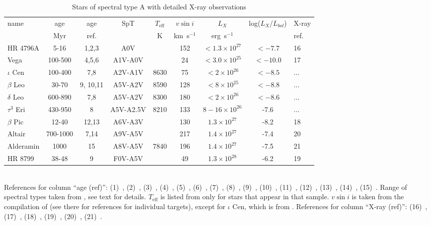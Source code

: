 \documentclass[linenumbers]{aastex631}
\begin{document}
\begin{table}
\caption{Stars of spectral type A with detailed X-ray observations \label{tab}}
\begin{tabular}{lcccccccl}
  name      & age & age & SpT  & $T_\mathrm{eff}$ & $v\sin i$ & $L_X$ &   log($L_X$/$L_{bol}$) & X-ray\\
            & Myr & ref.&  & K & km~s$^{-1}$    & erg~s$^{-1}$  &  & ref. \\
\hline
HR 4796A    & 5-16 & 1,2,3   & A0V & & 152 & $<1.3\times 10^{27}$  & $< -7.7$ & 16\\
Vega  & 100-500 & 4,5,6   & A1V-A0V & & 24 & $<3.0\times 10^{25}$  & $< -10.0$& 17\\
$\iota$ Cen & 100-400 & 7,8 & A2V-A1V & 8630 & 75 & $<2\times 10^{26}$  & $< -8.5$ & ...\\
$\beta$ Leo & 30-70& 9, 10,11 & A5V-A2V & 8590 & 128 & $<8\times 10^{25}$  & $< -8.8$ & ...\\
$\delta$ Leo& 600-890 & 7,8 & A5V-A2V & 8300 & 180 & $<2\times 10^{26}$  & $< -8.6$ & ...\\
$\tau^3$ Eri & 430-950 & 8 & A5V-A2.5V & 8210 & 133 & $8-16\times 10^{26}$  & -7.6 & ...\\
$\beta$ Pic & 12-40 & 12,13 & A6V-A3V  & & 130 & $1.3\times10^{27}$   & -8.2  & 18\\
Altair    & 700-1000 & 7,14  & A9V-A5V  & & 217 &  $1.4\times10^{27}$   & -7.4     &  20\\
Alderamin & 1000 & 15  & A8V-A5V & 7840 & 196 & $1.4\times10^{27}$ & -7.5 & 21\\
HR 8799   & 38-48 & 9    & F0V-A5V  & & 49 & $1.3\times10^{28}$   & -6.2     &  19\\

\hline
\end{tabular}\\
References for column ``age (ref)'':
(1)~\citet{1999ApJ...512L..63W},
(2)~\citet{2013ApJ...767...96W},
(3)~\citet{2014ApJ...786..136D},
(4)~\citet{1998A&A...339..831B},
(5)~\citet{2010ApJ...712..250H},
(6)~\citet{2010ApJ...708...71Y},
(7)~\citet{2012AJ....143..135V},
(8)~\citet{2015ApJ...804..146D},
(9)~\citet{2015MNRAS.454..593B},
(10)~\citet{2019ApJ...870...27Z},
(11)~\citet{2019MNRAS.489.2189L},
(12)~\citet{2001ApJ...562L..87Z},
(13)~\citet{2010ApJ...723.1599M},
(14)~\citet{2018AJ....156..286S},
(15)~\citet{2009ApJ...701..209Z}.
Range of spectral types taken from \citet{2014yCat....1.2023S}, see text for details. $T_\mathrm{eff}$ is listed from \citet{2002ApJ...579..800S} only for stars that appear in that sample. $v \sin i$ is taken from the compilation of \citet{2002A&A...393..897R} (see there for references for individual targets), except for $\iota$ Cen, which is from \cite{2002ApJ...579..800S}. References for column ``X-ray (ref)'':
(16)~\citet{2014ApJ...786..136D},
(17)~\citet{2006ApJ...636..426P},
(18)~\citet{2012ApJ...750...78G},
(19)~\citet{2010A&A...516A..38R},
(20)~{\citet{2009A&A...497..511R}},
(21)~\cite{2002ApJ...579..800S}.
\end{table}
\end{document}
